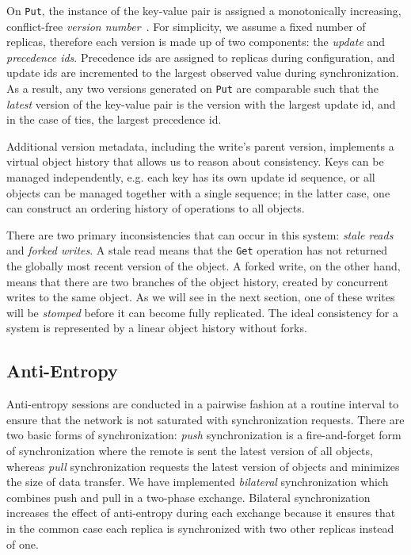 On \texttt{Put}, the instance of the key-value pair is assigned a
monotonically increasing, conflict-free \textit{version
number}~\cite{almeida_version_2002}.
For simplicity, we assume a fixed number of replicas, therefore each version
is made up of two components: the \textit{update} and \textit{precedence ids}.
Precedence ids are assigned to replicas during configuration, and update ids
are incremented to the largest observed value during synchronization.
As a result, any two versions generated on \texttt{Put} are comparable such
that the \textit{latest} version of the key-value pair is the version with the
largest update id, and in the case of ties, the largest precedence id.

Additional version metadata, including the write's parent version, implements
a virtual object history that allows us to reason about consistency.
Keys can be managed independently, e.g. each key has its own update id
sequence, or all objects can be managed together with a single sequence; in
the latter case, one can construct an ordering history of operations to all
objects.

There are two primary inconsistencies that can occur in this system:
\textit{stale reads} and \textit{forked writes}.
A stale read means that the \texttt{Get} operation has not returned
the globally most recent version of the object.
A forked write, on the other hand, means that there are two branches of the
object history, created by concurrent writes to the same object.
As we will see in the next section, one of these writes will be
\textit{stomped} before it can become fully replicated.
The ideal consistency for a system is represented by a linear object history
without forks.

\subsection*{Anti-Entropy}

Anti-entropy sessions are conducted in a pairwise fashion at a routine
interval to ensure that the network is not saturated with synchronization
requests.
There are two basic forms of synchronization: \textit{push} synchronization
is a fire-and-forget form of synchronization where the remote is sent the
latest version of all objects, whereas \textit{pull} synchronization requests
the latest version of objects and minimizes the size of data transfer.
We have implemented \textit{bilateral} synchronization which combines push
and pull in a two-phase exchange.
Bilateral synchronization increases the effect of anti-entropy during each
exchange because it ensures that in the common case each replica is
synchronized with two other replicas instead of one.

